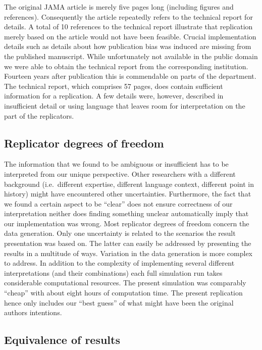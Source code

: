 \documentclass[
  english,
  doc,floatsintext,draftall]{apa6}
\begin{document}
The original JAMA article is merely five pages long (including figures and references).
Consequently the article repeatedly refers to the technical report for details.
A total of 10 references to the technical report illustrate that replication merely based on the article would not have been feasible.
Crucial implementation details such as details about how publication bias was induced are missing from the published manuscript.
While unfortunately not available in the public domain we were able to obtain the technical report from the corresponding institution.
Fourteen years after publication this is commendable on parts of the department.
The technical report, which comprises 57 pages, does contain sufficient information for a replication.
A few details were, however, described in insufficient detail or using language that leaves room for interpretation on the part of the replicators.

\hypertarget{replicator-degrees-of-freedom-1}{%
\subsection{Replicator degrees of freedom}\label{replicator-degrees-of-freedom-1}}

The information that we found to be ambiguous or insufficient has to be interpreted from our unique perspective.
Other researchers with a different background (i.e.~different expertise, different language context, different point in history) might have encountered other uncertainties.
Furthermore, the fact that we found a certain aspect to be \enquote{clear} does not ensure correctness of our interpretation neither does finding something unclear automatically imply that our implementation was wrong.
Most replicator degrees of freedom concern the data generation.
Only one uncertainty is related to the scenarios the result presentation was based on.
The latter can easily be addressed by presenting the results in a multitude of ways.
Variation in the data generation is more complex to address.
In addition to the complexity of implementing several different interpretations (and their combinations) each full simulation run takes considerable computational resources.
The present simulation was comparably \enquote{cheap} with about eight hours of computation time.
The present replication hence only includes our \enquote{best guess} of what might have been the original authors intentions.

\hypertarget{equivalence-of-results}{%
\subsection{Equivalence of results}\label{equivalence-of-results}}
\end{document}
